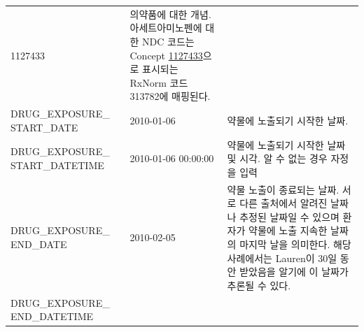 \documentclass[11pt]{book}
\theoremstyle{definition}
\theoremstyle{definition}
\theoremstyle{definition}
\theoremstyle{remark}
\begin{document}
\begin{longtable}[]{@{}lll@{}}
\begin{minipage}[t]{0.16\columnwidth}
1127433\strut
\end{minipage} & \begin{minipage}[t]{0.48\columnwidth}\raggedright\strut
의약품에 대한 개념. 아세트아미노펜에 대한 NDC 코드는 Concept
\href{http://athena.ohdsi.org/search-terms/terms/1127433}{1127433}으로
표시되는 RxNorm 코드 313782에 매핑된다.\strut
\end{minipage}\tabularnewline
\begin{minipage}[t]{0.28\columnwidth}\raggedright\strut
DRUG\_EXPOSURE\_ START\_DATE\strut
\end{minipage} & \begin{minipage}[t]{0.16\columnwidth}\raggedright\strut
2010-01-06\strut
\end{minipage} & \begin{minipage}[t]{0.48\columnwidth}\raggedright\strut
약물에 노출되기 시작한 날짜.\strut
\end{minipage}\tabularnewline
\begin{minipage}[t]{0.28\columnwidth}\raggedright\strut
DRUG\_EXPOSURE\_ START\_DATETIME\strut
\end{minipage} & \begin{minipage}[t]{0.16\columnwidth}\raggedright\strut
2010-01-06 00:00:00\strut
\end{minipage} & \begin{minipage}[t]{0.48\columnwidth}\raggedright\strut
약물에 노출되기 시작한 날짜 및 시각. 알 수 없는 경우 자정을 입력\strut
\end{minipage}\tabularnewline
\begin{minipage}[t]{0.28\columnwidth}\raggedright\strut
DRUG\_EXPOSURE\_ END\_DATE\strut
\end{minipage} & \begin{minipage}[t]{0.16\columnwidth}\raggedright\strut
2010-02-05\strut
\end{minipage} & \begin{minipage}[t]{0.48\columnwidth}\raggedright\strut
약물 노출이 종료되는 날짜. 서로 다른 출처에서 알려진 날짜나 추정된
날짜일 수 있으며 환자가 약물에 노출 지속한 날짜의 마지막 날을 의미한다.
해당 사례에서는 Lauren이 30일 동안 받았음을 알기에 이 날짜가 추론될 수
있다.\strut
\end{minipage}\tabularnewline
\begin{minipage}[t]{0.28\columnwidth}\raggedright\strut
DRUG\_EXPOSURE\_ END\_DATETIME\strut
\end{minipage} & \begin{minipage}[t]{0.16\columnwidth}\raggedright\strut

\end{minipage}
\end{longtable}
\end{document}

